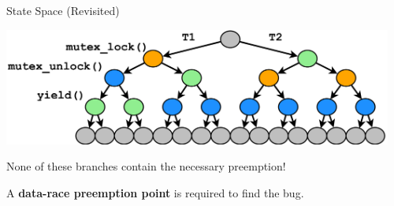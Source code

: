 \documentclass[xcolor=dvipsnames]{beamer}
\begin{document}
\begin{frame}{State Space (Revisited)}
	\begin{center}
		\includegraphics[width=0.96\textwidth]{../../oopsla/tree-maximal-only.pdf}
	\end{center}
	\linegap

	None of these branches contain the necessary preemption!
	\linegap

	A {\bf data-race preemption point} is required to find the bug.
\end{frame}
\end{document}
